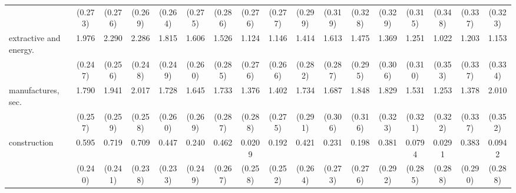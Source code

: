 {\begin{tabular}{l*{16}{c}}
                    &     (0.273)         &     (0.276)         &     (0.269)         &     (0.264)         &     (0.275)         &     (0.286)         &     (0.276)         &     (0.277)         &     (0.299)         &     (0.319)         &     (0.328)         &     (0.329)         &     (0.315)         &     (0.348)         &     (0.337)         &     (0.323)         \\
[1em]
extractive and energy.&       1.976\sym{***}&       2.290\sym{***}&       2.286\sym{***}&       1.815\sym{***}&       1.606\sym{***}&       1.526\sym{***}&       1.124\sym{***}&       1.146\sym{***}&       1.414\sym{***}&       1.613\sym{***}&       1.475\sym{***}&       1.369\sym{***}&       1.251\sym{***}&       1.022\sym{**} &       1.203\sym{***}&       1.153\sym{***}\\
                    &     (0.247)         &     (0.256)         &     (0.248)         &     (0.249)         &     (0.260)         &     (0.285)         &     (0.276)         &     (0.266)         &     (0.282)         &     (0.287)         &     (0.295)         &     (0.306)         &     (0.310)         &     (0.353)         &     (0.337)         &     (0.334)         \\
[1em]
manufactures, sec.  &       1.790\sym{***}&       1.941\sym{***}&       2.017\sym{***}&       1.728\sym{***}&       1.645\sym{***}&       1.733\sym{***}&       1.376\sym{***}&       1.402\sym{***}&       1.734\sym{***}&       1.687\sym{***}&       1.848\sym{***}&       1.829\sym{***}&       1.531\sym{***}&       1.253\sym{***}&       1.378\sym{***}&       2.010\sym{***}\\
                    &     (0.257)         &     (0.259)         &     (0.258)         &     (0.260)         &     (0.269)         &     (0.287)         &     (0.288)         &     (0.275)         &     (0.291)         &     (0.306)         &     (0.316)         &     (0.323)         &     (0.321)         &     (0.322)         &     (0.337)         &     (0.352)         \\
[1em]
construction        &       0.595\sym{*}  &       0.719\sym{**} &       0.709\sym{**} &       0.447         &       0.240         &       0.462         &      0.0209         &       0.192         &       0.421         &       0.231         &       0.198         &       0.381         &      0.0794         &      0.0291         &       0.383         &      0.0942         \\
                    &     (0.240)         &     (0.241)         &     (0.238)         &     (0.233)         &     (0.249)         &     (0.267)         &     (0.258)         &     (0.252)         &     (0.264)         &     (0.273)         &     (0.276)         &     (0.292)         &     (0.285)         &     (0.288)         &     (0.290)         &     (0.288)         \\

\end{tabular}}
